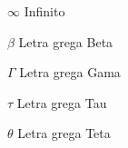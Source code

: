 
\begin{simbolos}
    \item[$ \infty $] Infinito
    \item[$ \beta $] Letra grega Beta
    \item[$ \Gamma $] Letra grega Gama
    \item[$ \tau $] Letra grega Tau
    \item[$ \theta $] Letra grega Teta
\end{simbolos}

